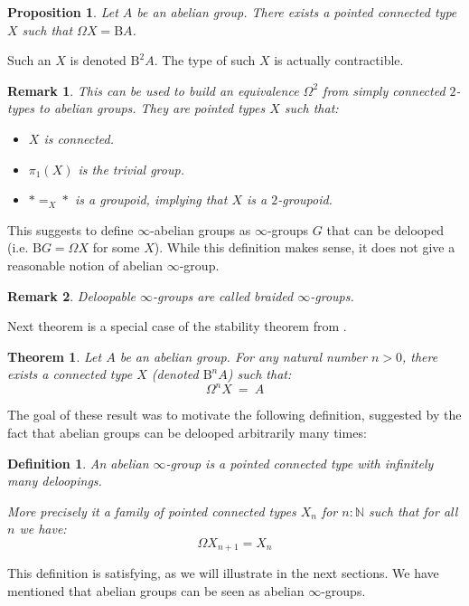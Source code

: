 \documentclass{article}
\newcommand{\B}{\mathrm{B}}
\newtheorem{definition}{Definition}
\newtheorem{proposition}{Proposition}
\newtheorem{theorem}{Theorem}
\newtheorem{remark}{Remark}
\begin{document}
\begin{proposition}
Let $A$ be an abelian group. There exists a pointed connected type $X$ such that $\Omega X = \B A$.
\end{proposition}

Such an $X$ is denoted $\B^2A$. The type of such $X$ is actually contractible.

\begin{remark}
This can be used to build an equivalence $\Omega^2$ from simply connected $2$-types to abelian groups. They are pointed types $X$ such that:
\begin{itemize}
\item $X$ is connected.
\item $\pi_1(X)$ is the trivial group.
\item $*=_X*$ is a groupoid, implying that $X$ is a $2$-groupoid.
\end{itemize}
\end{remark}

This suggests to define $\infty$-abelian groups as $\infty$-groups $G$ that can be delooped (i.e. $\B G = \Omega X$ for some $X$). While this definition makes sense, it does not give a reasonable notion of abelian $\infty$-group.

\begin{remark}
Deloopable $\infty$-groups are called \emph{braided $\infty$-groups}.
\end{remark}

 Next theorem is a special case of the stability theorem from \cite{buchholtz2018higher}.

\begin{theorem}
Let $A$ be an abelian group. For any natural number $n>0$, there exists a connected type $X$ (denoted $\B^nA$) such that:
\[\Omega^n X \ = \ A\]
\end{theorem}

The goal of these result was to motivate the following definition, suggested by the fact that abelian groups can be delooped arbitrarily many times:

\begin{definition}
An abelian $\infty$-group is a pointed connected type with infinitely many deloopings. 

More precisely it a family of pointed connected types $X_n$ for $n:\mathbb{N}$ such that for all $n$ we have:
\[\Omega X_{n+1} = X_n\]
\end{definition}

This definition is satisfying, as we will illustrate in the next sections. We have mentioned that abelian groups can be seen as abelian $\infty$-groups.
\end{document}
